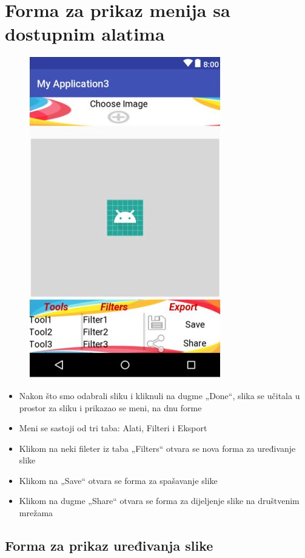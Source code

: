 \documentclass[12pt]{scrreprt}
\begin{document}
\chapter{Forma za prikaz menija sa dostupnim alatima}

\begin{figure}[h]
	\begin{Center}
		\includegraphics{image5}
	\end{Center}
\end{figure}

\begin{itemize}
	\item Nakon što smo odabrali sliku i kliknuli na dugme „Done“, slika se učitala u prostor za sliku i prikazao se meni, na dnu forme
	\item Meni se sastoji od tri taba: Alati, Filteri i Eksport
	\item Klikom na neki fileter iz taba „Filters“ otvara se nova forma za uređivanje slike
	\item Klikom na „Save“ otvara se forma za spašavanje slike
	\item Klikom na dugme „Share“ otvara se forma za dijeljenje slike na društvenim mrežama
\end{itemize}
\break
\section{Forma za prikaz uređivanja slike}
\end{document}
